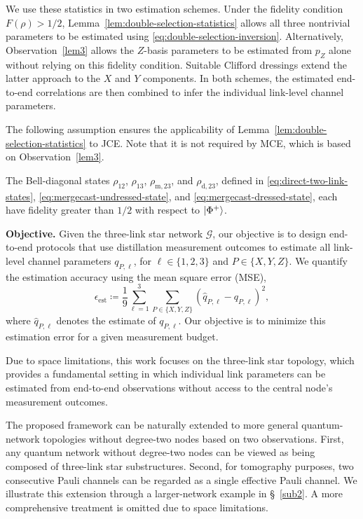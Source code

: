We use these statistics in two estimation schemes.
Under the fidelity condition $F(\rho)>1/2$,
Lemma~\ref{lem:double-selection-statistics} allows all three
nontrivial parameters to be estimated using
\eqref{eq:double-selection-inversion}.
Alternatively, Observation~\ref{lem3} allows the $Z$-basis parameters
to be estimated from $p_Z$ alone without relying on this fidelity condition.
Suitable Clifford dressings extend the latter approach to
the $X$ and $Y$ components.
In both schemes, the estimated end-to-end correlations are
then combined to infer the individual link-level channel parameters.

The following assumption ensures the applicability of
Lemma~\ref{lem:double-selection-statistics} to  JCE.
Note that it is not required by MCE, which is based on
Observation~\ref{lem3}.

\begin{assumption}
    \label{ass:fidelity-condition}
    The Bell-diagonal states
    $\rho_{12}$, $\rho_{13}$, $\rho_{\text{m},23}$, and
    $\rho_{\text{d},23}$, defined in
    \eqref{eq:direct-two-link-states},
    \eqref{eq:mergecast-undressed-state}, and
    \eqref{eq:mergecast-dressed-state}, each have fidelity greater
    than $1/2$ with respect to $\ket{\Phi^+}$.
\end{assumption}


\textbf{Objective.}
Given the three-link star network
\(\mathcal G\), our objective is to design end-to-end protocols that use distillation
measurement outcomes to estimate all link-level channel parameters
\(q_{P,\ell}\), for \(\ell\in\{1,2,3\}\) and
\(P\in\{X,Y,Z\}\). We quantify the estimation accuracy using the mean square error (MSE),
\begin{equation}
    \epsilon_{\mathrm{est}}
    \coloneqq
        \frac{1}{9}
        \sum_{\ell=1}^{3}
        \sum_{P\in\{X,Y,Z\}}
        \left(
        \widehat{q}_{P,\ell}-q_{P,\ell}
        \right)^2
    ,
\end{equation}
where \(\widehat{q}_{P,\ell}\) denotes the estimate of \(q_{P,\ell}\).
Our objective is to minimize this estimation error for a given measurement budget.
\begin{remark}
    \label{rem:general-topology}
    Due to space limitations, this work focuses on the three-link star
    topology, which provides a fundamental setting in which individual
    link parameters can be estimated from end-to-end observations
    without access to the central node's measurement outcomes.

    The proposed framework can be naturally extended to more general
    quantum-network topologies without degree-two nodes based on two
    observations. First, any quantum network without degree-two nodes can
    be viewed as being composed of three-link star substructures. Second,
    for tomography purposes, two consecutive Pauli channels can be
    regarded as a single effective Pauli channel. We illustrate this
    extension through a larger-network example in \S~\ref{sub2}.
    A more comprehensive treatment is omitted due to space limitations.
\end{remark}
